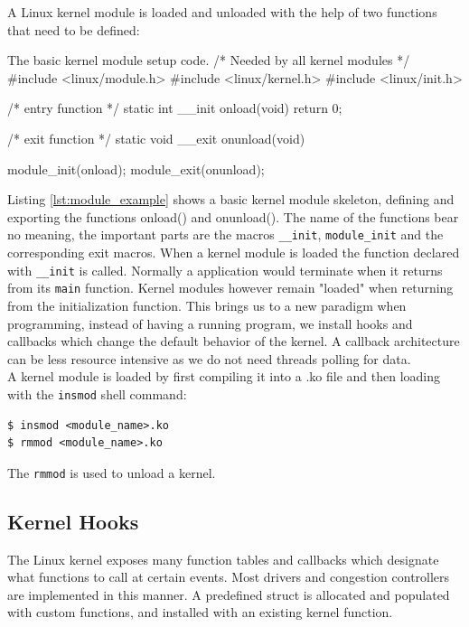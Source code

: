 \documentclass[a4paper,english, 11pt]{report}
\begin{document}
A Linux kernel module is loaded and unloaded with the help of two functions that need to be defined:\\

\begin{autonumlstlisting}[label=lst:module_example]{The basic kernel module setup code.}
/* Needed by all kernel modules */
#include <linux/module.h> 
#include <linux/kernel.h>
#include <linux/init.h>

/* entry function */
static int __init onload(void) {
    return 0;
}

/* exit function */
static void __exit onunload(void) {
    
}

module_init(onload);
module_exit(onunload);
\end{autonumlstlisting}

Listing \ref{lst:module_example} shows a basic kernel module skeleton, defining and exporting the functions onload() and onunload(). The name of the functions bear no meaning, the important parts are the macros \verb|__init|, \verb|module_init| and the corresponding exit macros\cite{lkm}. When a kernel module is loaded the function declared with \verb|__init| is called. Normally a application would terminate when it returns from its \verb|main| function. Kernel modules however remain "loaded" when returning from the initialization function. This brings us to a new paradigm when programming, instead of having a running program, we install hooks and callbacks which change the default behavior of the kernel. A callback architecture can be less resource intensive as we do not need threads polling for data.\\

A kernel module is loaded by first compiling it into a .ko file and then loading with the \verb|insmod| shell command:
\begin{verbatim}
$ insmod <module_name>.ko
$ rmmod <module_name>.ko
\end{verbatim}
The \verb|rmmod| is used to unload a kernel. 

\subsection{Kernel Hooks}
The Linux kernel exposes many function tables and callbacks which designate what functions to call at certain events. Most drivers and congestion controllers are implemented in this manner. A predefined struct is allocated and populated with custom functions, and installed with an existing kernel function.
\end{document}
